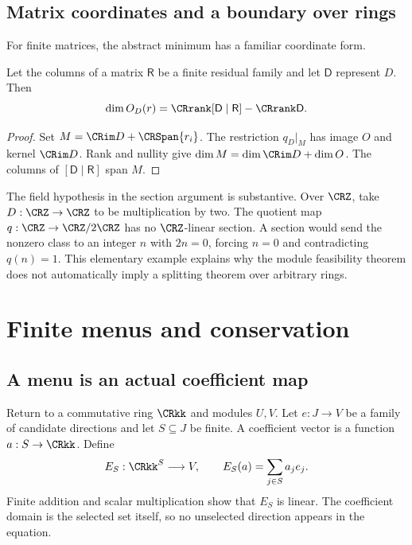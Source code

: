 \subsection{Matrix coordinates and a boundary over rings}
For finite matrices, the abstract minimum has a familiar coordinate form.

\begin{CRcorollary}\label{CR:cor:rank-difference}
Let the columns of a matrix $\mathsf R$ be a finite residual family and let $\mathsf D$ represent $D$. Then
\[
\dim O_D(r)=\CRrank[\mathsf D\mid\mathsf R]-\CRrank\mathsf D.
\]
\end{CRcorollary}
\begin{proof}
Set $M=\CRim D+\CRSpan\{r_i\}$. The restriction $q_D\vert_M$ has image $O$ and kernel $\CRim D$. Rank and nullity give $\dim M=\dim\CRim D+\dim O$. The columns of $[\mathsf D\mid\mathsf R]$ span $M$.
\end{proof}

The field hypothesis in the section argument is substantive. Over $\CRZ$, take $D:\CRZ\to\CRZ$ to be multiplication by two. The quotient map $q:\CRZ\to\CRZ/2\CRZ$ has no $\CRZ$-linear section. A section would send the nonzero class to an integer $n$ with $2n=0$, forcing $n=0$ and contradicting $q(n)=1$. This elementary example explains why the module feasibility theorem does not automatically imply a splitting theorem over arbitrary rings.



\section{Finite menus and conservation}\label{CR:cr-source-section-3}\label{CR:ch:menu}
\subsection{A menu is an actual coefficient map}
Return to a commutative ring $\CRkk$ and modules $U,V$. Let $e:J\to V$ be a family of candidate directions and let $S\subseteq J$ be finite. A coefficient vector is a function $a:S\to\CRkk$. Define
\begin{equation}\label{CR:eq:menu}
E_S:\CRkk^S\longrightarrow V,\qquad E_S(a)=\sum_{j\in S}a_je_j.
\end{equation}
Finite addition and scalar multiplication show that $E_S$ is linear. The coefficient domain is the selected set itself, so no unselected direction appears in the equation.

